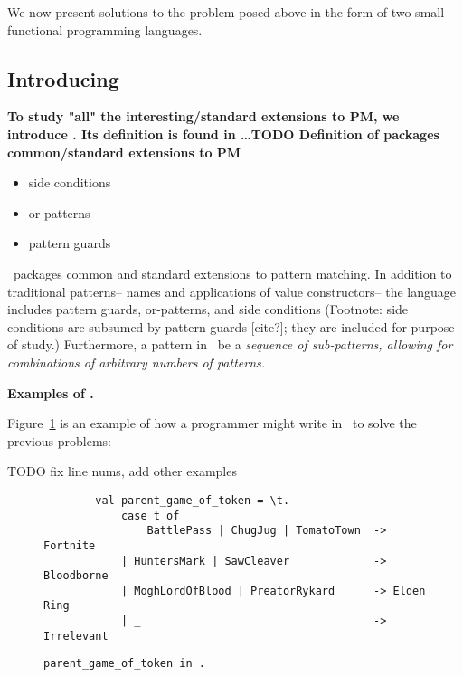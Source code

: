 \documentclass[manuscript,screen,review, 12pt]{acmart}
\begin{document}
We now present solutions to the problem posed above in the form of two small
functional programming languages. %

\subsection{Introducing \PPlus\ }

\begin{outline}[enumerate]
    \1 \bf{To study "all" the interesting/standard extensions to PM, we introduce}
    \PPlus. Its definition is found in \dots TODO 
    \2 \bf{Definition of \PPlus}
    \2 \bf{{\PPlus} packages common/standard extensions to PM}
    \begin{itemize}
        \item side conditions
        \item or-patterns 
        \item pattern guards 
    \end{itemize}

    \PPlus\ packages common and standard extensions to pattern matching. In
    addition to traditional patterns-- names and applications of value
    constructors-- the language includes pattern guards, or-patterns, and side
    conditions (Footnote: side conditions are subsumed by pattern guards
    [cite?]; they are included for purpose of study.) Furthermore, a pattern in
    \PPlus\ be a \it{sequence} of sub-patterns, allowing for combinations of 
    arbitrary numbers of patterns. 
    
    \3 \bf{Examples of \PPlus. }

    Figure~\ref{fig:ppexs} is an example of how a programmer might write in \PPlus\ to solve 
    the previous problems: 

    TODO fix line nums, add other examples 
    \begin{figure}
        \begin{center}
            \pplst 
            \begin{lstlisting}
        val parent_game_of_token = \t. 
            case t of  
                BattlePass | ChugJug | TomatoTown  -> Fortnite
            | HuntersMark | SawCleaver             -> Bloodborne
            | MoghLordOfBlood | PreatorRykard      -> Elden Ring
            | _                                    -> Irrelevant
        \end{lstlisting}
        \end{center}    
        \caption{\tt{parent\_game\_of\_token} in \PPlus.} 
        \label{fig:ppexs}
        \end{figure}
    

\end{outline}
\end{document}

